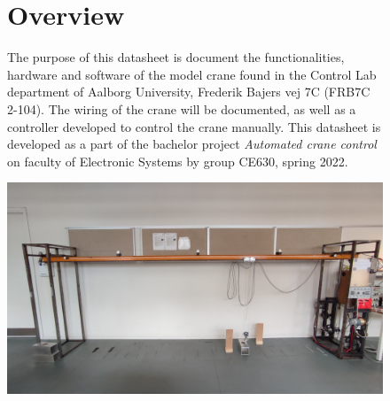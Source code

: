 \documentclass[a4paper,12pt,oneside,pdflatex,italian,final,twocolumn]{article}
\begin{document}
\begin{figure}[H]
\begin{minipage}{0.47\textwidth}
\section{Overview}
The purpose of this datasheet is document the functionalities, hardware and software of the model crane found in the Control Lab department of Aalborg University, Frederik Bajers vej 7C (FRB7C 2-104). The wiring of the crane will be documented, as well as a controller developed to control the crane manually. This datasheet is developed as a part of the bachelor project \textit{Automated crane control} on faculty of Electronic Systems by group CE630, spring 2022. 
\end{minipage}
\hfill
\begin{minipage}{0.47\textwidth}
\centering
\includegraphics[width=1\textwidth,right]{pictures/cranePik.jpg}
\end{minipage}
\end{figure}





\end{document}
